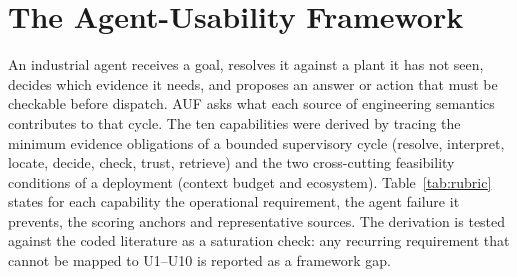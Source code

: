 \section{The Agent-Usability Framework}
\label{sec:auf}

An industrial agent receives a goal, resolves it against a plant it has not seen, decides
which evidence it needs, and proposes an answer or action that must be checkable before
dispatch. AUF asks what each source of engineering semantics contributes to that cycle.
The ten capabilities were derived by tracing the minimum evidence obligations of a
bounded supervisory cycle (resolve, interpret, locate, decide, check, trust, retrieve)
and the two cross-cutting feasibility conditions of a deployment (context budget and
ecosystem). Table~\ref{tab:rubric} states for each capability the operational requirement,
the agent failure it prevents, the scoring anchors and representative sources. The
derivation is tested against the coded literature as a saturation check: any recurring
requirement that cannot be mapped to U1--U10 is reported as a framework gap.

